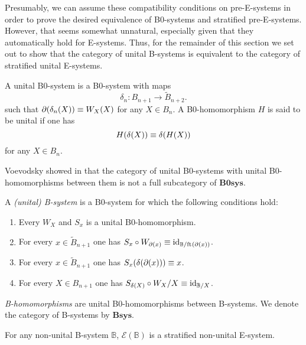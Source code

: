 Presumably, we can assume these compatibility conditions on pre-E-systems in order
to prove the desired equivalence of B0-systems and stratified pre-E-systems. However,
that seems somewhat unnatural, especially given that they automatically hold
for E-systems. Thus, for the remainder of this section we set out to show that
the category of unital B-systems is equivalent to the category of stratified 
unital E-systems.

\begin{defn}
A unital B0-system is a B0-system with maps
\begin{equation*}
\delta_n : B_{n+1}\to \tilde{B}_{n+2}.
\end{equation*}
such that $\partial_{}(\delta_n(X))\equiv W_{X}(X)$ for any $X\in B_n$. 
A B0-homomorphism $H$ is said to be unital if one has
\begin{equation*}
H(\delta(X))\equiv\delta(H(X))
\end{equation*}
for any $X\in B_n$.  
\end{defn}

\begin{rmk}
Voevodsky showed in \cite{VV_B-systems} that the category of unital B0-systems
with unital B0-homomorphisms between them is not a full
subcategory of $\mathbf{B0sys}$. 
\end{rmk}

\begin{defn}
A \emph{(unital) B-system} is a B0-system for which the following conditions
hold:
\begin{enumerate}
\item Every $W_X$ and $S_x$ is a unital B0-homomorphism.
\item For every $x\in \tilde{B}_{n+1}$ one has $S_x\circ W_{\partial_{}(x)}\equiv
{\mathrm{id}_{\mathbb{B}/\mathrm{ft}_{}(\partial_{}(x))}}$. 
\item For every $x\in\tilde{B}_{n+1}$ one has $S_x(\delta(\partial_{}(x)))\equiv x$.
\item For every $X\in B_{n+1}$ one has $S_{\delta(X)}\circ W_X/X\equiv
{\mathrm{id}_{\mathbb{B}/X}}$. 
\end{enumerate}
\emph{B-homomorphisms} are unital B0-homomorphisms between B-systems.
We denote the category of B-systems by $\mathbf{Bsys}$. 
\end{defn}

\begin{lem}
For any non-unital B-system $\mathbb{B}$, $\mathcal{E}(\mathbb{B})$ is a 
stratified non-unital E-system. 
\end{lem}

